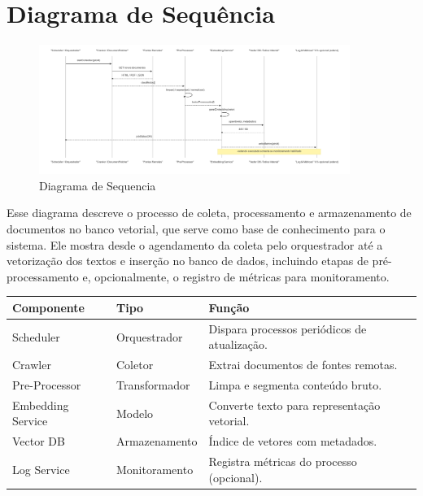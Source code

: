 \section{Diagrama de Sequência}
\begin{figure}[H]
  \centering
  \includegraphics[width=0.9\textwidth]{latex-overleaf/04-figuras/sequencia-recuperacao-vetorizacao-dados.png}
  \caption{Diagrama de Sequencia}
  \label{fig:diagrama-sequencia}
\end{figure}

Esse diagrama descreve o processo de coleta, processamento e armazenamento de documentos no banco vetorial, que serve como base de conhecimento para o sistema. Ele mostra desde o agendamento da coleta pelo orquestrador até a vetorização dos textos e inserção no banco de dados, incluindo etapas de pré-processamento e, opcionalmente, o registro de métricas para monitoramento. 

\begin{table}[h]
\centering
\begin{tabular}{|p{3cm}|p{4cm}|p{8cm}|}
    \hline
    \textbf{Componente} & \textbf{Tipo} & \textbf{Função} \\ \hline
    Scheduler & Orquestrador & Dispara processos periódicos de atualização. \\ \hline
    Crawler & Coletor & Extrai documentos de fontes remotas. \\ \hline
    Pre-Processor & Transformador & Limpa e segmenta conteúdo bruto. \\ \hline
    Embedding Service & Modelo & Converte texto para representação vetorial. \\ \hline
    Vector DB & Armazenamento & Índice de vetores com metadados. \\ \hline
    Log Service & Monitoramento & Registra métricas do processo (opcional). \\ \hline
\end{tabular}
\end{table}

